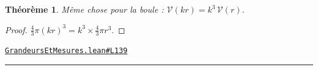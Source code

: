 \documentclass[11pt,a4paper]{article}
\theoremstyle{definition}
\theoremstyle{plain}
\newtheorem{theoreme}{Théorème}
\newcommand{\source}[2]{\par\smallskip\noindent\hfill{\footnotesize\href{#1}{\texttt{#2}}}\par\smallskip}
\begin{document}
\begin{theoreme}
Même chose pour la boule : $\mathcal{V}(kr) = k^3\,\mathcal{V}(r)$.
\end{theoreme}

\begin{proof}
$\tfrac43 \pi (kr)^3 = k^3 \times \tfrac43 \pi r^3$.
\end{proof}
\source{https://github.com/Commutator-IO/learn-lean/blob/main/cours/01-college/04-grandeurs-et-mesures/GrandeursEtMesures.lean\#L139}{GrandeursEtMesures.lean\#L139}

\vfill
\noindent\rule{0.35\linewidth}{0.4pt}\par
{}
\end{document}
